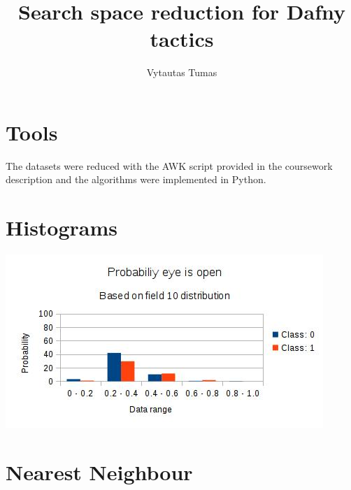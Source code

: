 \documentclass[a4paper, titlepage]{article}
\begin{document}
\newcommand{\currcmt}{\value{commentcount}}

\newcommand{\comment}[2]{#1\marginpar{#2}}
\newcommand{\ggcomment}[1]{\comment{\textcolor{red}{$^{\arabic{commentcount}}$}}{\textcolor{red}{$^{\arabic{commentcount}}$GG: #1}}\stepcounter{commentcount}}
\newcommand{\vtcomment}[1]{\comment{\textcolor{blue}{$^{\arabic{commentcount}}$}}{\textcolor{blue}{$^{\arabic{commentcount}}$VT: #1}}\stepcounter{commentcount}}
\newcommand{\dcode}[1]{\texttt{#1}}

\title{
Search space reduction for Dafny tactics
}

\author{Vytautas Tumas}

\maketitle
\tableofcontents

\section{Tools}
The datasets were reduced with the AWK script provided in the coursework description and the algorithms were implemented in Python.
\section{Histograms}
\includegraphics[scale=0.5]{eeg/field_10}
\section{Nearest Neighbour}
\end{document}
